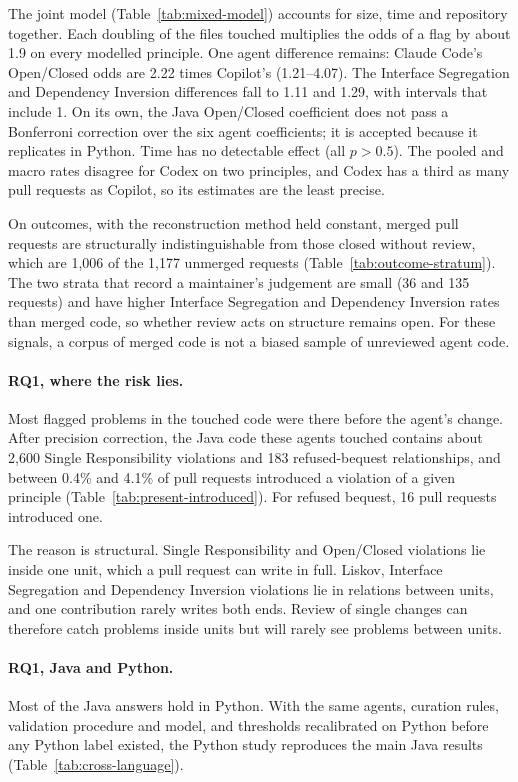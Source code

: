 The joint model (Table~\ref{tab:mixed-model}) accounts for size, time and repository together. Each
doubling of the files touched multiplies the odds of a flag by about 1.9 on every modelled principle.
One agent difference remains: Claude Code's Open/Closed odds are 2.22 times Copilot's (1.21--4.07).
The Interface Segregation and Dependency Inversion differences fall to 1.11 and 1.29, with intervals
that include 1. On its own, the Java Open/Closed coefficient does not pass a Bonferroni correction
over the six agent coefficients; it is accepted because it replicates in Python. Time has no
detectable effect (all $p > 0.5$). The pooled and macro rates disagree for Codex on two principles,
and Codex has a third as many pull requests as Copilot, so its estimates are the least precise.

On outcomes, with the reconstruction method held constant, merged pull requests are structurally
indistinguishable from those closed without review, which are 1{,}006 of the 1{,}177 unmerged
requests (Table~\ref{tab:outcome-stratum}). The two strata that record a maintainer's judgement are
small (36 and 135 requests) and have higher Interface Segregation and Dependency Inversion rates than
merged code, so whether review acts on structure remains open. For these signals, a corpus of merged
code is not a biased sample of unreviewed agent code.

\paragraph{RQ1, where the risk lies.}
Most flagged problems in the touched code were there before the agent's change. After precision
correction, the Java code these agents touched contains about 2,600 Single Responsibility violations
and 183 refused-bequest relationships, and between 0.4\% and 4.1\% of pull requests introduced a
violation of a given principle (Table~\ref{tab:present-introduced}). For refused bequest, 16 pull
requests introduced one.

The reason is structural. Single Responsibility and Open/Closed violations lie inside one unit, which
a pull request can write in full. Liskov, Interface Segregation and Dependency Inversion violations
lie in relations between units, and one contribution rarely writes both ends. Review of single
changes can therefore catch problems inside units but will rarely see problems between units.

\paragraph{RQ1, Java and Python.}
Most of the Java answers hold in Python. With the same agents, curation rules, validation procedure and model, and thresholds
recalibrated on Python before any Python label existed, the Python study reproduces the main Java
results (Table~\ref{tab:cross-language}).

